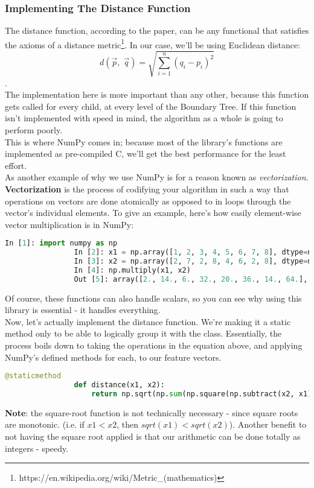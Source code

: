 \documentclass[12pt,letterpaper]{article}
\begin{document}
			\subsubsection{Implementing The Distance Function}
				The distance function, according to the paper, can be any functional that satisfies the axioms of a distance metric\footnote{https://en.wikipedia.org/wiki/Metric\_(mathematics)}. In our case, we'll be using Euclidean distance:
				$$d(\vec{p},\;\vec{q}) = \sqrt{\sum_{i=1}^{n} (q_i - p_i)^2}$$.\\
				The implementation here is more important than any other, because this function gets called for every child, at every level of the Boundary Tree. If this function isn't implemented with speed in mind, the algorithm as a whole is going to perform poorly.\\
				This is where NumPy comes in; because most of the library's functions are implemented as pre-compiled C, we'll get the best performance for the least effort. \\
				As another example of why we use NumPy is for a reason known as \textit{vectorization}. \textbf{Vectorization} is the process of codifying your algorithm in such a way that operations on vectors are done atomically as opposed to in loops through the vector's individual elements.
				To give an example, here's how easily element-wise vector multiplication is in NumPy:
				\begin{lstlisting}[language=Python]
				In [1]: import numpy as np
				In [2]: x1 = np.array([1, 2, 3, 4, 5, 6, 7, 8], dtype=np.float32)
				In [3]: x2 = np.array([2, 7, 2, 8, 4, 6, 2, 8], dtype=np.float32)
				In [4]: np.multiply(x1, x2)
				Out [5]: array([2., 14., 6., 32., 20., 36., 14., 64.], dtype=float32)
				\end{lstlisting}
				
				Of course, these functions can also handle scalars, so you can see why using this library is essential - it handles everything.\\
				
				Now, let's actually implement the distance function. We're making it a static method only to be able to logically group it with the class. Essentially, the process boils down to taking the operations in the equation above, and applying NumPy's defined methods for each, to our feature vectors. 
				\begin{lstlisting}[frame=single, language=Python]
				@staticmethod
				def distance(x1, x2):
					return np.sqrt(np.sum(np.square(np.subtract(x2, x1))))
				\end{lstlisting}%
				\small \textbf{Note}: the square-root function is not technically necessary - since square roots are monotonic. (i.e. if $x1 < x2$, then $sqrt(x1) < sqrt(x2)$). Another benefit to not having the square root applied is that our arithmetic can be done totally as integers - speedy. 
				\normalsize
\end{document}
